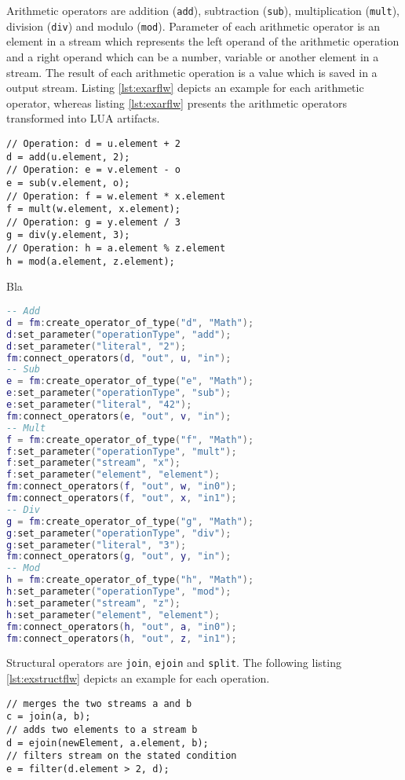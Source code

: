 Arithmetic operators are addition (\texttt{add}), subtraction 
(\texttt{sub}), multiplication (\texttt{mult}), division (\texttt{div}) and
modulo (\texttt{mod}). Parameter of each arithmetic operator is an element in
a stream which represents the left operand of the arithmetic operation and
a right operand which can be a number, variable or another element in a stream. 
The result of each arithmetic operation is a value which is saved in a output
stream. Listing \ref{lst:exarflw} depicts an example for each arithmetic 
operator, whereas listing \ref{lst:exarflw} presents the arithmetic operators 
transformed into LUA artifacts.
\begin{lstlisting}[language=Flow, caption={\emph{Examples of Arithmetic Operators in Flow}},label={lst:exarflw}]
// Operation: d = u.element + 2
d = add(u.element, 2);
// Operation: e = v.element - o
e = sub(v.element, o);
// Operation: f = w.element * x.element
f = mult(w.element, x.element);
// Operation: g = y.element / 3
g = div(y.element, 3);
// Operation: h = a.element % z.element
h = mod(a.element, z.element); 
\end{lstlisting}
Bla
\begin{lstlisting}[language=LUA, caption={\emph{Examples of Arithmetic Operators in LUA}},label={lst:exanlua}]
-- Add
d = fm:create_operator_of_type("d", "Math");
d:set_parameter("operationType", "add");
d:set_parameter("literal", "2");
fm:connect_operators(d, "out", u, "in");
-- Sub
e = fm:create_operator_of_type("e", "Math");
e:set_parameter("operationType", "sub");
e:set_parameter("literal", "42");
fm:connect_operators(e, "out", v, "in");
-- Mult
f = fm:create_operator_of_type("f", "Math");
f:set_parameter("operationType", "mult");
f:set_parameter("stream", "x");
f:set_parameter("element", "element");
fm:connect_operators(f, "out", w, "in0");
fm:connect_operators(f, "out", x, "in1");
-- Div
g = fm:create_operator_of_type("g", "Math");
g:set_parameter("operationType", "div");
g:set_parameter("literal", "3");
fm:connect_operators(g, "out", y, "in");
-- Mod
h = fm:create_operator_of_type("h", "Math");
h:set_parameter("operationType", "mod");
h:set_parameter("stream", "z");
h:set_parameter("element", "element");
fm:connect_operators(h, "out", a, "in0");
fm:connect_operators(h, "out", z, "in1");
\end{lstlisting}
Structural operators are \texttt{join}, \texttt{ejoin} and \texttt{split}. The
following listing \ref{lst:exstructflw} depicts an example for each operation.
\begin{lstlisting}[language=Flow, caption={\emph{Examples of Structural Operators}},label={lst:exstructflw}]
// merges the two streams a and b
c = join(a, b);
// adds two elements to a stream b
d = ejoin(newElement, a.element, b);	
// filters stream on the stated condition
e = filter(d.element > 2, d);
\end{lstlisting}
